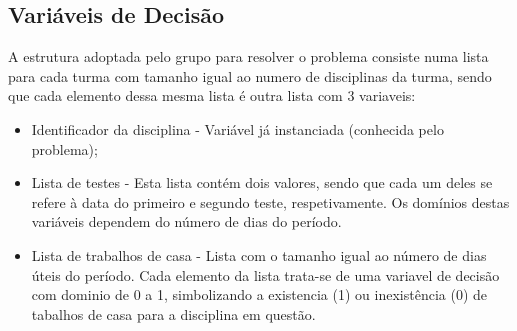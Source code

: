 \documentclass{llncs}
\begin{document}
\subsection{Variáveis de Decisão}
A estrutura adoptada pelo grupo para resolver o problema consiste numa lista para cada turma com tamanho igual ao numero de disciplinas da turma, sendo que cada elemento dessa mesma lista é outra lista com 3 variaveis: 
\begin{itemize}
	\item Identificador da disciplina - Variável já instanciada (conhecida pelo problema);
	\item Lista de testes - Esta lista contém dois valores, sendo que cada um deles se refere à data do primeiro e segundo teste, respetivamente. Os domínios destas variáveis dependem do número de dias do período.
	\item Lista de trabalhos de casa - Lista com o tamanho igual ao número de dias úteis do período. Cada elemento da lista trata-se de uma variavel de decisão com dominio de 0 a 1, simbolizando a existencia (1) ou inexistência (0) de tabalhos de casa para a disciplina em questão.
\end{itemize}
\end{document}
